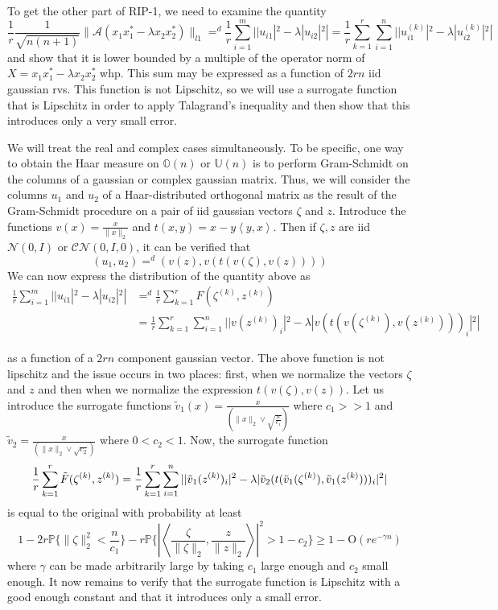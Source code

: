 \documentclass[11pt]{article}
\newcommand{\<}{\langle}
\renewcommand{\>}{\rangle}
\newcommand{\cA}{\mathcal{A}}
\numberwithin{equation}{section}
\begin{document}
To get the other part of RIP-1, we need to examine the quantity
\[
\frac{1}{r}\frac{1}{\sqrt{n(n+1)}}\|\cA(x_1 x_1^* - \lambda x_2 x_2^*)\|_{l1}  =^d \frac{1}{r}\sum_{i=1}^{m} | |u_{i1}|^2 - \lambda |u_{i2}|^2 | = \frac{1}{r}\sum_{k=1}^{r}\sum_{i=1}^{n} | |u_{i1}^{(k)}|^2 - \lambda |u_{i2}^{(k)}|^2 | 
\]
and show that it is lower bounded by a multiple of the operator norm of $X = x_1 x_1^* - \lambda x_2 x_2^*$ whp. This sum may be expressed as a function of $2rn$ iid gaussian rvs. This function is not Lipschitz, so we will use a surrogate function that is Lipschitz in order to apply Talagrand's inequality \cite{Two} and then show that this introduces only a very small error. 

We will treat the real and complex cases simultaneously. To be specific, one way to obtain the Haar measure on $\mathbb{O}(n)$ or $\mathbb{U}(n)$ is to perform Gram-Schmidt on the columns of a gaussian or complex gaussian matrix. Thus, we will consider the columns $u_1$ and $u_2$ of a Haar-distributed orthogonal matrix as the result of the Gram-Schmidt procedure on a pair of iid gaussian vectors $\zeta$ and $z$. Introduce the functions $v(x) = \frac{x}{\|x\|_2}$ and $t(x,y) = x - y\left<y,x\right>$. Then if $\zeta, z$ are iid $\mathcal{N}(0,I)$ or $\mathcal{C}\mathcal{N}(0,I,0)$, it can be verified that 
\[
(u_1,u_2) =^d (v(z),v(t(v(\zeta),v(z))))
\]
We can now express the distribution of the quantity above as 
\begin{align*}
\frac{1}{r}\sum_{i=1}^{m} | |u_{i1}|^2 - \lambda |u_{i2}|^2 |   &=^d \frac{1}{r}\sum_{k=1}^r F(\zeta^{(k)},z^{(k)})\\
&= \frac{1}{r}\sum_{k=1}^{r}\sum_{i=1}^{n} | |v(z^{(k)})_i|^2 - \lambda |v(t(v(\zeta^{(k)}),v(z^{(k)})))_i|^2 | 
\end{align*}

as a function of a $2rn$ component gaussian vector. The above function is not lipschitz and the issue occurs in two places: first, when we normalize the vectors $\zeta$ and $z$ and then when we normalize the expression $t(v(\zeta),v(z))$. Let us introduce the surrogate functions $\tilde{v}_{1}(x) = \frac{x}{(\|x\|_2 \vee \sqrt{\frac{n}{c_1}})}$ where $c_1 >>1$ and $\tilde{v}_2 = \frac{x}{(\|x\|_2 \vee \sqrt{c_2})}$ where $0< c_2< 1$. Now, the surrogate function
\[
\frac{1}{r}\sum_{k=1}^r \tilde{F}(\zeta^{(k)},z^{(k)})\\ = \frac{1}{r}\sum_{k=1}^{r}\sum_{i=1}^{n} | |\tilde{v}_1 (z^{(k)})_i|^2 - \lambda |\tilde{v}_2 (t(\tilde{v}_1 (\zeta^{(k)}),\tilde{v}_1 (z^{(k)})))_i|^2 | 
\]
is equal to the original with probability at least 
\[
 1 - 2r\mathbb{P}\{ \|\zeta\|_2^2 < \frac{n}{c_1} \} - r\mathbb{P}\{ |\left<\frac{\zeta}{\|\zeta\|_2},\frac{z}{\|z\|_2} \right>|^2 > 1- c_2\} \geq 1- \text{O}\left(re^{-\gamma n}\right)
 \]
 where $\gamma$ can be made arbitrarily large by taking $c_1$ large enough and $c_2$ small enough. It now remains to verify that the surrogate function is Lipschitz with a good enough constant and that it introduces only a small error.\\
\end{document}

